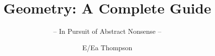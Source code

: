 \documentclass[graybox,envcountchap,sectrefs]{style/svmono}
\begin{document}
\author{E/Ea Thompson}
\title{Geometry: A Complete Guide}
\subtitle{-- In Pursuit of Abstract Nonsense --}
\maketitle

\frontmatter%

%
%

%

\tableofcontents

%


\mainmatter%




\backmatter%
%
%
%
\printindex

\end{document}
